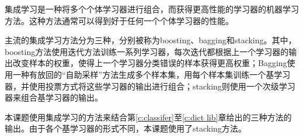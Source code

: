 
\label{c:ensemble}
集成学习是一种将多个个体学习器进行组合，而获得更高性能的学习器的机器学习方法。这种方法通常可以得到好于任何一个个体学习器的性能。

主流的集成学习方法分为三种，分别被称为boosting、bagging和stacking。其中，boosting方法使用迭代方法训练一系列学习器，每次迭代都根据上一个学习器的输出改变样本的权重，使得上一个学习器分类错误的样本获得更高权重；Bagging使用一种有放回的“自助采样”方法生成多个样本集，用每个样本集训练一个基学习器，并使用投票方式将这些学习器的输出进行组合；stacking则使用一个次级学习器来组合基学习器的输出。

本课题使用集成学习的方法来结合第\ref{c:classifer}至\ref{c:dict lib}章给出的三种方法的输出。由于各个基学习器的形式不同，本课题使用了stacking方法。